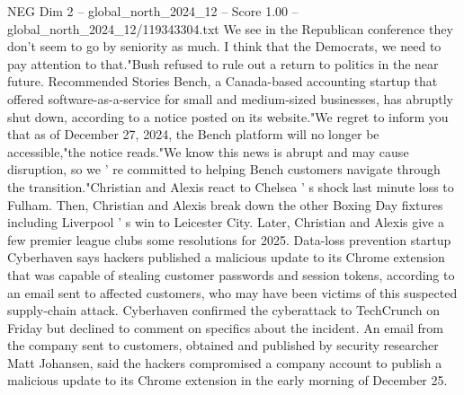 \begin{textsample}{NEG Dim 2 – global\_north\_2024\_12 – Score 1.00 – global\_north\_2024\_12/119343304.txt}
We see in the Republican conference they don't seem to go by seniority as much.
I think that the Democrats, we need to pay attention to that."Bush refused to rule out a return to politics in the near future.
Recommended Stories Bench, a Canada-based accounting startup that offered software-as-a-service for small and medium-sized businesses, has abruptly shut down, according to a notice posted on its website."We regret to inform you that as of December 27, 2024, the Bench platform will no longer be accessible,"the notice reads."We know this news is abrupt and may cause disruption, so we ' re committed to helping Bench customers navigate through the transition."Christian and Alexis react to Chelsea ' s shock last minute loss to Fulham.
Then, Christian and Alexis break down the other Boxing Day fixtures including Liverpool ' s win to Leicester City.
Later, Christian and Alexis give a few premier league clubs some resolutions for 2025.
Data-loss prevention startup Cyberhaven says hackers published a malicious update to its Chrome extension that was capable of stealing customer passwords and session tokens, according to an email sent to affected customers, who may have been victims of this suspected supply-chain attack.
Cyberhaven confirmed the cyberattack to TechCrunch on Friday but declined to comment on specifics about the incident.
An email from the company sent to customers, obtained and published by security researcher Matt Johansen, said the hackers compromised a company account to publish a malicious update to its Chrome extension in the early morning of December 25.

\end{textsample}
